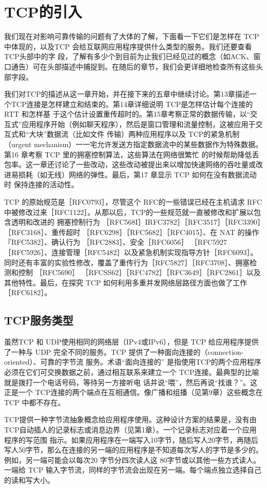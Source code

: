 \section{TCP的引入}
我们现在对影响可靠传输的问题有了大体的了解，下面看一下它们是怎样在 TCP 中体现的，以及TCP 会给互联网应用程序提供什么类型的服务。我们还要查看TCP头部中的字
段，了解有多少个到目前为止我们已经见过的概念（如ACK、窗口通告）可在头部描述中捕捉到。在随后的章节，我们会更详细地检查所有这些头部字段。

我们对TCP的描述从这一章开始，并在接下来的五章中继续讨论。第13章描述一个TCP连接是怎样建立和结束的。第14章详细说明 TCP是怎样估计每个连接的RTT 和怎样基
于这个估计设置重传超时的。第15章考察正常的数据传输，以“交互式”应用程序开始（例如聊天程序），然后是窗口管理和流量控制，这被应用于交互式和“大块”数据流（比如文件
传输）两种应用程序以及 TCP的紧急机制（urgent mechanism）一一宅允许发送方指定数据流中的某些数据作为特殊数据。第16 章考察 TCP 里的拥塞控制算法，这些算法在网络很繁忙
的时候帮助降低丢包率。这一章还讨论了一些改动，这些改动被提出来以增加快速网络的吞吐量或改进易损耗（如无线）网络的弹性。最后，第17 章显示 TCP 如何在没有数据流动时
保持连接的活动性。

TCP 的原始规范是［RFC0793］，尽管这个 RFC的一些错误已经在主机请求 RFC中被修改过来［RFC1122］。从那以后，TCP的一些规范就一直被修改和扩展以包含透明和改进的
拥塞控制行为 ［RFC568I］IRFC3782］［RFC3517］［RFC3390］［RFC3168］、重传超时 ［RFC6298］［RFC5682］［RFC4015］、在 NAT 的操作『RFC5382］、确认行为 ［RFC2883］、安全［RFC6056］
［RFC5927［RFC5926］、连接管理［RFC5482］以及紧急机制实现指导方针［RFC6093］。同时还有丰富的实验性修改，覆盖了重传行为［RFC5827］［RFC3708］、拥塞检测和控制 ［RFC5690］
［RFCSS62］［RFC4782］［RFC3649］［RFC2861］以及其他特性。最后，在探究 TCP 如何利用多重并发网络层路径方面也做了工作 ［RFC6182］。
\subsection{TCP服务类型}
虽然TCP 和 UDP使用相同的网络层（IPv4或IPv6），但是 TCP 给应用程序提供了一种与 UDP 完全不同的服务。TCP 提供了一种面向连接的（connection-oriented）、可靠的字节流
服务。术语“面向连接的” 是指使用TCP的两个应用程序必须在它们可交换数据之前，通过相互联系来建立一个 TCP连接。最典型的比喻就是拨打一个电话号码，等待另一方接听电
话并说“喂”，然后再说“找谁？”。这正是一个 TCP连接的两个端点在互相通信。像广播和组播（见第9章）这些概念在 TCP 中都不存在。

TCP提供一种字节流抽象概念给应用程序使用。这种设计方案的结果是，没有由TCP自动插人的记录标志或消息边界（见第1章）。一个记录标志对应着一个应用程序的写范围
指示。如果应用程序在一端写入10字节，随后写人20字节，再随后写人50字节，那么在连接的另一端的应用程序是不知道每次写人的字节是多少的。例如，另一端可能会以每次20
字节分四次读人这 80字节或以其他一些方式读人。一端给 TCP 输入字节流，同样的字节流会出现在另一端。每个端点独立选择自己的读和写大小。

